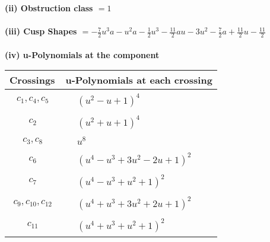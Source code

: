 \documentclass[1p]{elsarticle_modified}
\theoremstyle{definition}
\begin{document}
\flushleft \textbf{(ii) Obstruction class $= 1$}\\~\\
\flushleft \textbf{(iii) Cusp Shapes $= -\frac{7}{2} u^3 a- u^2 a-\frac{1}{2} u^3-\frac{11}{2} a u-3 u^2-\frac{7}{2} a+\frac{11}{2} u-\frac{11}{2}$}\\~\\
\newpage\renewcommand{\arraystretch}{1}
\flushleft \textbf{(iv) u-Polynomials at the component}\newline \\
\begin{tabular}{m{50pt}|m{274pt}}
Crossings & \hspace{64pt}u-Polynomials at each crossing \\
\hline $$\begin{aligned}c_{1},c_{4},c_{5}\end{aligned}$$&$\begin{aligned}
&(u^2- u+1)^4
\end{aligned}$\\
\hline $$\begin{aligned}c_{2}\end{aligned}$$&$\begin{aligned}
&(u^2+u+1)^4
\end{aligned}$\\
\hline $$\begin{aligned}c_{3},c_{8}\end{aligned}$$&$\begin{aligned}
&u^8
\end{aligned}$\\
\hline $$\begin{aligned}c_{6}\end{aligned}$$&$\begin{aligned}
&(u^4- u^3+3 u^2-2 u+1)^2
\end{aligned}$\\
\hline $$\begin{aligned}c_{7}\end{aligned}$$&$\begin{aligned}
&(u^4- u^3+u^2+1)^2
\end{aligned}$\\
\hline $$\begin{aligned}c_{9},c_{10},c_{12}\end{aligned}$$&$\begin{aligned}
&(u^4+u^3+3 u^2+2 u+1)^2
\end{aligned}$\\
\hline $$\begin{aligned}c_{11}\end{aligned}$$&$\begin{aligned}
&(u^4+u^3+u^2+1)^2
\end{aligned}$\\
\hline
\end{tabular}\\~\\
\end{document}
